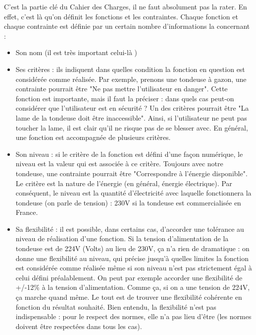 \begin{enumerate}
C'est la partie clé du Cahier des Charges, il ne faut absolument pas la rater. En effet, c'est là qu'on définit les fonctions et les contraintes.
Chaque fonction et chaque contrainte est définie par un certain nombre d'informations la concernant :\\
\begin{itemize}
  \item Son nom (il est très important celui-là )\\
  \item Ses critères : ils indiquent dans quelles condition la fonction en question est considérée comme réalisée.
    Par exemple, prenons une tondeuse à gazon, une contrainte pourrait être "Ne pas mettre l'utilisateur en danger". 
    Cette fonction est importante, mais il faut la préciser : dans quels cas peut-on considérer que l'utilisateur est en sécurité ? 
    Un des critères pourrait être "La lame de la tondeuse doit être inaccessible". Ainsi, si l'utilisateur ne peut pas toucher la lame, il est clair qu'il ne risque pas de se blesser avec. 
    En général, une fonction est accompagnée de plusieurs critères.\\
  \item Son niveau : si le critère de la fonction est défini d'une façon numérique, le niveau est la valeur qui est associée à ce critère. 
    Toujours avec notre tondeuse, une contrainte pourrait être "Correspondre à l'énergie disponible". 
    Le critère est la nature de l'énergie (en général, énergie électrique). 
    Par conséquent, le niveau est la quantité d'électricité avec laquelle fonctionnera la tondeuse (on parle de tension) : 230V si la tondeuse est commercialisée en France.\\
  \item Sa flexibilité : il est possible, dans certains cas, d'accorder une tolérance au niveau de réalisation d'une fonction. 
    Si la tension d'alimentation de la tondeuse est de 224V (Volts) au lieu de 230V, ça n'a rien de dramatique : on donne une flexibilité au niveau, 
    qui précise jusqu'à quelles limites la fonction est considérée comme réalisée même si son niveau n'est pas strictement égal à celui défini préalablement. 
    On peut par exemple accorder une flexibilité de +/-12\% à la tension d'alimentation. Comme ça, si on a une tension de 224V, ça marche quand même. 
    Le tout est de trouver une flexibilité cohérente en fonction du résultat souhaité. Bien entendu, la flexibilité n'est pas indispensable : pour le respect des normes, elle n'a pas lieu d'être (les normes doivent être respectées dans tous les cas).\\
\end{itemize}


\end{enumerate}
